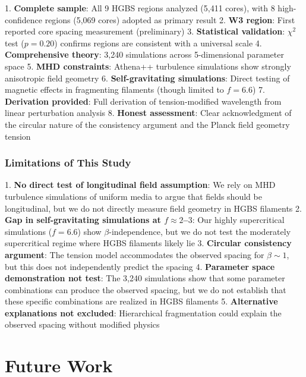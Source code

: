 \documentclass[11pt,a4paper]{article}
\begin{document}
1. \textbf{Complete sample}: All 9 HGBS regions analyzed (5,411 cores), with 8 high-confidence regions (5,069 cores) adopted as primary result
2. \textbf{W3 region}: First reported core spacing measurement (preliminary)
3. \textbf{Statistical validation}: $\chi^2$ test ($p=0.20$) confirms regions are consistent with a universal scale
4. \textbf{Comprehensive theory}: 3,240 simulations across 5-dimensional parameter space
5. \textbf{MHD constraints}: Athena++ turbulence simulations show strongly anisotropic field geometry
6. \textbf{Self-gravitating simulations}: Direct testing of magnetic effects in fragmenting filaments (though limited to $f = 6.6$)
7. \textbf{Derivation provided}: Full derivation of tension-modified wavelength from linear perturbation analysis
8. \textbf{Honest assessment}: Clear acknowledgment of the circular nature of the consistency argument and the Planck field geometry tension

\subsubsection{Limitations of This Study}

1. \textbf{No direct test of longitudinal field assumption}: We rely on MHD turbulence simulations of uniform media to argue that fields should be longitudinal, but we do not directly measure field geometry in HGBS filaments
2. \textbf{Gap in self-gravitating simulations at $f \approx 2$--$3$}: Our highly supercritical simulations ($f = 6.6$) show $\beta$-independence, but we do not test the moderately supercritical regime where HGBS filaments likely lie
3. \textbf{Circular consistency argument}: The tension model accommodates the observed spacing for $\beta \sim 1$, but this does not independently predict the spacing
4. \textbf{Parameter space demonstration not test}: The 3,240 simulations show that some parameter combinations can produce the observed spacing, but we do not establish that these specific combinations are realized in HGBS filaments
5. \textbf{Alternative explanations not excluded}: Hierarchical fragmentation could explain the observed spacing without modified physics

\section{Future Work}
\label{sec:future}
\end{document}
